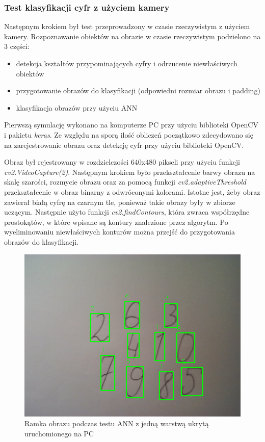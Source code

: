 \subsubsection{Test klasyfikacji cyfr z użyciem kamery}

Następnym krokiem był test przeprowadzony w czasie rzeczywistym z użyciem kamery. Rozpoznawanie obiektów na obrazie w czasie rzeczywistym podzielono na 3 części:
\begin{itemize}
    \item detekcja kształtów przypominających cyfry i odrzucenie niewłaściwych obiektów
    \item przygotowanie obrazów do klasyfikacji (odpowiedni rozmiar obrazu i padding)
    \item klasyfikacja obrazów przy użyciu ANN
\end{itemize}

Pierwszą symulację wykonano na komputerze PC przy użyciu biblioteki OpenCV i pakietu \emph{keras}.
Ze względu na sporą ilość obliczeń początkowo zdecydowano się na zarejestrowanie obrazu oraz detekcję cyfr przy użyciu biblioteki OpenCV. 

Obraz był rejestrowany w rozdzielczości 640x480 pikseli przy użyciu funkcji \emph{cv2.VideoCapture(2)}. Następnym krokiem 
było przekształcenie barwy obrazu na skalę szarości, rozmycie obrazu oraz za pomocą funkcji \emph{cv2.adaptiveThreshold} 
przekształcenie w obraz binarny z odwróconymi kolorami. Istotne jest, żeby obraz zawierał białą cyfrę na czarnym tle, ponieważ takie obrazy były w zbiorze uczącym.  Następnie użyto funkcji \emph{cv2.findContours}, która zwraca współrzędne prostokątów, w które wpisane są kontury znalezione przez algorytm. Po wyeliminowaniu niewłaściwych konturów można przejść do przygotowania obrazów do klasyfikacji. 

\begin{figure}[!h]
    \centering
    \includegraphics[width=\textwidth]{img/1hid-layer-pc-img.png}
    \caption{Ramka obrazu podczas testu ANN z jedną warstwą ukrytą uruchomionego na PC}
    \label{1hid-layer-pc-img}
  \end{figure}

